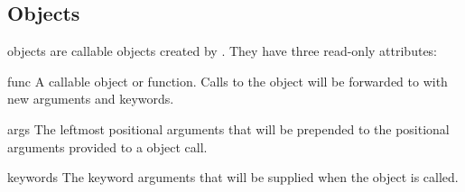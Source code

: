 \subsection{ Objects \label{partial-objects}}


 objects are callable objects created by .
They have three read-only attributes:

\begin{memberdesc}[callable]{func}{}
A callable object or function.  Calls to the  object will
be forwarded to  with new arguments and keywords.
\end{memberdesc}

\begin{memberdesc}[tuple]{args}{}
The leftmost positional arguments that will be prepended to the
positional arguments provided to a  object call.
\end{memberdesc}

\begin{memberdesc}[dict]{keywords}{}
The keyword arguments that will be supplied when the  object
is called.
\end{memberdesc}

